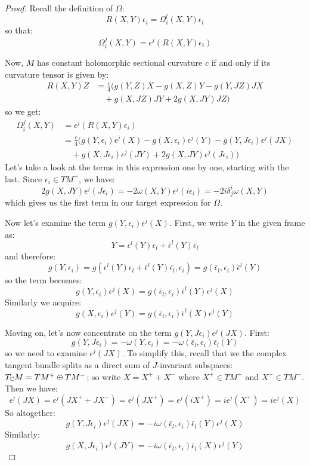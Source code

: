 \begin{proof}
Recall the definition of $\Omega$:
%
$$ R(X,Y) \epsilon_i = \Omega^l_i (X,Y) \epsilon_l $$
%
so that:
%
$$ \Omega^j_i (X,Y) = \epsilon^j ( R(X,Y) \epsilon_i ) $$

Now, $M$ has constant holomorphic sectional curvature $c$ if and only if its curvature tensor is given by:
%
\begin{align*}
R(X,Y)Z &= \frac{c}{4} (g(Y,Z)X - g(X,Z)Y - g(Y,JZ)JX  \\
& \quad + g(X, JZ)JY + 2 g(X,JY)JZ )
\end{align*}
%
so we get:
%
\begin{align*}
\Omega^j_i (X,Y) &= \epsilon^j ( R(X,Y) \epsilon_i ) \\
&= \frac{c}{4} (g(Y, \epsilon_i ) \epsilon^j(X) - g(X, \epsilon_i ) \epsilon^j(Y) - g(Y,J \epsilon_i ) \epsilon^j (JX)  \\
& \quad + g(X, J \epsilon_i ) \epsilon^j (JY) + 2 g(X,JY)\epsilon^j( J \epsilon_i ) )
\end{align*}
%
Let's take a look at the terms in this expression one by one, starting with the last.  Since $\epsilon_i \in TM^{+}$, we have:
%
$$ 2 g(X,JY)\epsilon^j( J \epsilon_i )= - 2 \omega( X, Y ) \epsilon^j ( i \epsilon_i ) = - 2 i \delta^i_j \omega( X, Y ) $$
%
which gives us the first term in our target expression for $\Omega$.  

Now let's examine the term $g( Y, \epsilon_i ) \epsilon^j(X)$.  First, we write $Y$ in the given frame as:
%
$$ Y = \epsilon^l (Y) \epsilon_l + \bar{ \epsilon }^l (Y) \bar{ \epsilon_l } $$
%
and therefore:
%
$$ g( Y, \epsilon_i ) = g( \epsilon^l (Y) \epsilon_l + \bar{ \epsilon }^l (Y) \bar{ \epsilon_l }, \epsilon_i ) = g( \bar{ \epsilon }_l, \epsilon_i ) \bar{ \epsilon }^l (Y) $$
%
so the term becomes:
%
$$ g( Y, \epsilon_i ) \epsilon^j(X) = g( \bar{ \epsilon }_l, \epsilon_i ) \bar{ \epsilon }^l (Y) \epsilon^j(X) $$
%
Similarly we acquire:
%
$$ g(X, \epsilon_i ) \epsilon^j(Y) = g( \bar{\epsilon}_l, \epsilon_i ) \bar{ \epsilon }^l (X) \epsilon^j (Y) $$

Moving on, let's now concentrate on the term $g(Y,J \epsilon_i ) \epsilon^j (JX)$.  First:
%
$$ g(Y,J \epsilon_i ) = - \omega( Y, \epsilon_i ) = - \omega( \bar{ \epsilon }_l, \epsilon_i ) \bar{ \epsilon }_l (Y) $$
%
so we need to examine $\epsilon^j (JX)$.  To simplify this, recall that we the complex tangent bundle splits as a direct sum of $J$-invariant subspaces: $T_{\mathbb{C}} M = TM^{+} \oplus TM^{-}$; so write $X = X^{+} + X^{-}$ where $X^{+} \in TM^{+}$ and $X^{-} \in TM^{-}$.  Then we have:
%
$$ \epsilon^j (JX) = \epsilon^j ( JX^{+} + JX^{-} ) = \epsilon^j( JX^{+} ) = \epsilon^j( i X^{+} ) = i \epsilon^j ( X^{+} ) = i \epsilon^j (X) $$
%
So altogether:
%
$$ g(Y,J \epsilon_i ) \epsilon^j (JX) = - i \omega( \bar{ \epsilon }_l, \epsilon_i ) \bar{ \epsilon }_l (Y) \epsilon^j (X) $$
%
Similarly:
%
$$ g(X, J \epsilon_i ) \epsilon^j (JY) = - i \omega( \bar{ \epsilon }_l, \epsilon_i ) \bar{ \epsilon }_l (X) \epsilon^j (Y) $$


\end{proof}
